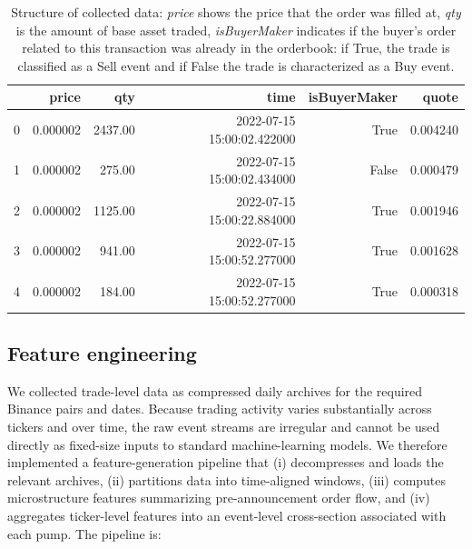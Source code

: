 \documentclass{ieeeaccess}
\begin{document}
\begin{table}[!t]
    \centering
    \begin{tabular}{lrrrrr}
        \toprule
         & price & qty & time & isBuyerMaker & quote \\
        \midrule
        0 & 0.000002 & 2437.00 & 2022-07-15 15:00:02.422000 & True & 0.004240 \\
        1 & 0.000002 & 275.00& 2022-07-15 15:00:02.434000 & False & 0.000479 \\
        2 & 0.000002 & 1125.00 & 2022-07-15 15:00:22.884000 & True & 0.001946 \\
        3 & 0.000002 & 941.00 & 2022-07-15 15:00:52.277000 & True & 0.001628 \\
        4 & 0.000002 & 184.00 & 2022-07-15 15:00:52.277000 & True & 0.000318 \\
        \bottomrule
    \end{tabular}
    \caption{Structure of collected data: \textit{price} shows the price that the order was filled at, \textit{qty} is the amount of base asset traded, \textit{isBuyerMaker} indicates if the buyer's order related to this transaction was already in the orderbook: if True, the trade is classified as a Sell event and if False the trade is characterized as a Buy event.}
    \label{table:collected_tick_data}
\end{table}


\subsection{Feature engineering}

We collected trade-level data as compressed daily archives for the required Binance pairs and dates. Because trading activity varies substantially across tickers and over time, the raw event streams are irregular and cannot be used directly as fixed-size inputs to standard machine-learning models. We therefore implemented a feature-generation pipeline that (i) decompresses and loads the relevant archives, (ii) partitions data into time-aligned windows, (iii) computes microstructure features summarizing pre-announcement order flow, and (iv) aggregates ticker-level features into an event-level cross-section associated with each pump. The pipeline is:
\end{document}
